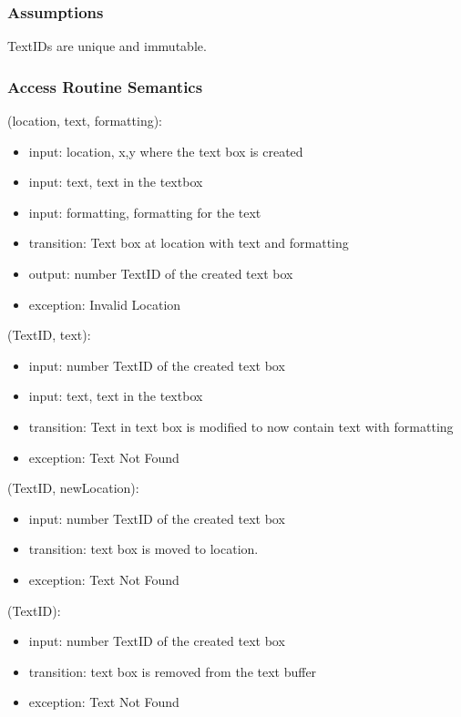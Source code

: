 \documentclass[12pt, titlepage]{article}
\begin{document}
\subsubsection{Assumptions}
TextIDs are unique and immutable.

\subsubsection{Access Routine Semantics}

(location, text, formatting):
\begin{itemize}
\item input: location, x,y where the text box is created
\item input: text, text in the textbox
\item input: formatting, formatting for the text
\item transition: Text box at location with text and formatting
\item output: number TextID of the created text box 
\item exception: Invalid Location
\end{itemize}

(TextID, text):
\begin{itemize}
\item input: number TextID of the created text box
\item input: text, text in the textbox
\item transition: Text in text box is modified to now contain text with formatting
\item exception: Text Not Found
\end{itemize}

(TextID, newLocation):
\begin{itemize}
\item input: number TextID of the created text box
\item transition: text box is moved to location.
\item exception: Text Not Found
\end{itemize}
(TextID):
\begin{itemize}
\item input: number TextID of the created text box
\item transition: text box is removed from the text buffer
\item exception: Text Not Found
\end{itemize}
\end{document}
